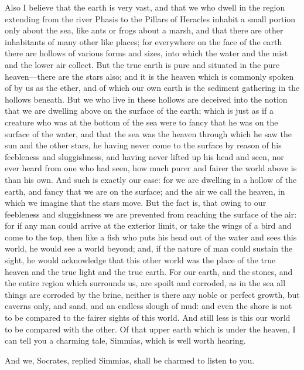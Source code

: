 \documentclass[11pt,letter]{article}
\begin{document}
\par  Also I believe that the earth is very vast, and that we who dwell in the region extending from the river Phasis to the Pillars of Heracles inhabit a small portion only about the sea, like ants or frogs about a marsh, and that there are other inhabitants of many other like places; for everywhere on the face of the earth there are hollows of various forms and sizes, into which the water and the mist and the lower air collect. But the true earth is pure and situated in the pure heaven—there are the stars also; and it is the heaven which is commonly spoken of by us as the ether, and of which our own earth is the sediment gathering in the hollows beneath. But we who live in these hollows are deceived into the notion that we are dwelling above on the surface of the earth; which is just as if a creature who was at the bottom of the sea were to fancy that he was on the surface of the water, and that the sea was the heaven through which he saw the sun and the other stars, he having never come to the surface by reason of his feebleness and sluggishness, and having never lifted up his head and seen, nor ever heard from one who had seen, how much purer and fairer the world above is than his own. And such is exactly our case: for we are dwelling in a hollow of the earth, and fancy that we are on the surface; and the air we call the heaven, in which we imagine that the stars move. But the fact is, that owing to our feebleness and sluggishness we are prevented from reaching the surface of the air: for if any man could arrive at the exterior limit, or take the wings of a bird and come to the top, then like a fish who puts his head out of the water and sees this world, he would see a world beyond; and, if the nature of man could sustain the sight, he would acknowledge that this other world was the place of the true heaven and the true light and the true earth. For our earth, and the stones, and the entire region which surrounds us, are spoilt and corroded, as in the sea all things are corroded by the brine, neither is there any noble or perfect growth, but caverns only, and sand, and an endless slough of mud: and even the shore is not to be compared to the fairer sights of this world. And still less is this our world to be compared with the other. Of that upper earth which is under the heaven, I can tell you a charming tale, Simmias, which is well worth hearing.

\par  And we, Socrates, replied Simmias, shall be charmed to listen to you.
\end{document}
